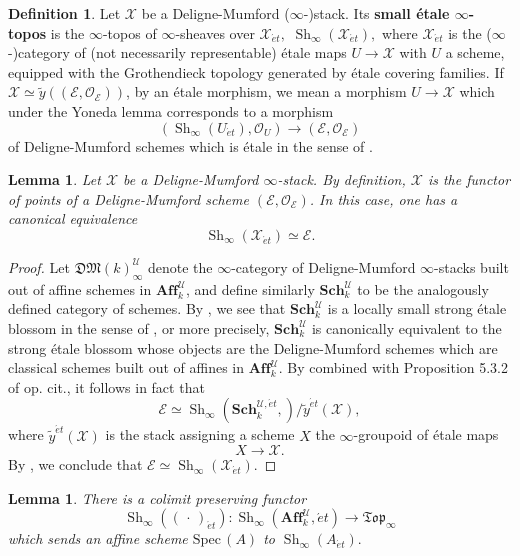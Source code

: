 \documentclass[12pt]{amsart}
\newtheorem{lemma}[dummy]{Lemma}
\theoremstyle{definition}
\newtheorem{definition}[dummy]{Definition}
\newcommand{\cE}{\mathcal{E}}
\newcommand{\cO}{\mathcal{O}}
\newcommand{\cU}{\mathcal{U}}
\newcommand{\cX}{\mathcal{X}}
\newcommand{\Affku}{\mathbf{Aff}^{\cU}_{k}}
\newcommand{\Topi}{\mathfrak{Top}_\i}
\newcommand{\Spec}{\mathrm{Spec}\,}
\newcommand{\Sh}{\operatorname{Sh}}
\newcommand{\et}{\acute{e}t}
\def\Sch{\mathbf{Sch}}
\renewcommand{\i}{\infty}
\def\Shi{\Sh_\i}
\def\blank{\mspace{3mu}\cdot\mspace{3mu}}
\begin{document}
\begin{definition}\label{dfn:smalletaledm}
Let $\cX$ be a Deligne-Mumford ($\i$-)stack. Its \textbf{small \'etale $\i$-topos} is the $\i$-topos of $\i$-sheaves over $\cX_{\et},$ $\Shi\left(\cX_{\et}\right),$ where $\cX_{\et}$ is the ($\i$-)category of (not necessarily representable) \'etale maps $U \to \cX$ with $U$ a scheme, equipped with the Grothendieck topology generated by \'etale covering families. If $\cX\simeq \tilde y\left(\left(\cE,\cO_{\cE}\right)\right)$, by an \'etale morphism, we mean a morphism $U \to \cX$ which under the Yoneda lemma corresponds to a morphism $$\left(\Shi\left(U_{\et}\right),\cO_{U}\right) \to \left(\cE,\cO_{\cE}\right)$$ of Deligne-Mumford schemes which is \'etale in the sense of \cite[Definition 2.3.1]{dagv}.
\end{definition}

\begin{lemma}\label{lem:sametopos}
Let $\cX$ be a Deligne-Mumford $\i$-stack. By definition, $\cX$ is the functor of points of a Deligne-Mumford scheme $\left(\cE,\mathcal{O}_\cE\right)$. In this case, one has a canonical equivalence $$\Shi\left(\cX_{\et}\right) \simeq \cE.$$
\end{lemma}

\begin{proof}
Let $\mathfrak{DM}\left(k\right)_\i^{\cU}$ denote the $\i$-category of Deligne-Mumford $\i$-stacks built out of affine schemes in $\Affku$, and define similarly $\Sch^{\cU}_k$ to be the analogously defined category of schemes.
By \cite[Remarks 5.19 and 5.23]{higherdave}, we see that $\Sch^{\cU}_k$ is a locally small strong \'etale blossom in the sense of \cite[Definition 5.1.7]{higherdave}, or more precisely, $\Sch^{\cU}_k$ is canonically equivalent to the strong \'etale blossom whose objects are the Deligne-Mumford schemes which are classical schemes built out of affines in $\Affku.$ By \cite[Theorems 5.3.6 and 5.3.7]{higherdave} combined with Proposition 5.3.2 of op. cit., it follows in fact that $$\cE\simeq \Shi\left(\Sch^{{\cU,\et}}_k,\right)/\tilde y^{\et}\left(\cX\right),$$ where $\tilde y^{\et}\left(\cX\right)$ is the stack assigning a scheme $X$ the $\i$-groupoid of \'etale maps $$X \to \cX.$$ By \cite[Remark 2.2.4 and Proposition 2.2.1]{higherdave}, we conclude that $\cE\simeq\Shi\left(\cX_{\et}\right).$
\end{proof}

\begin{lemma}\label{lem:smalletale}
There is a colimit preserving functor $$\Shi\left(\left(\blank\right)_{\et}\right):\Shi\left(\Affku,\et\right) \to \Topi$$ which sends an affine scheme $\Spec\left(A\right)$ to $\Shi\left(A_{\et}\right).$
\end{lemma}
\end{document}
